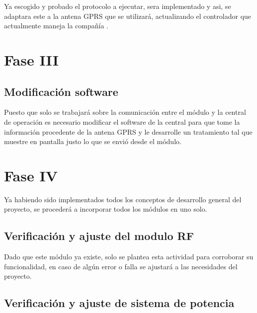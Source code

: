 Ya escogido y probado el protocolo a ejecutar, sera implementado y asi, se adaptara este a la antena GPRS que se utilizará, actualizando el controlador que actualmente maneja la compañía .

\section {Fase III}

\subsection{Modificación software }

Puesto que solo se trabajará sobre la comunicación entre el módulo y la central de operación es necesario modificar el software de la central para que tome la información procedente de la antena GPRS y le desarrolle un tratamiento tal que muestre en pantalla justo lo que se envió desde el módulo. 




\section {Fase IV}

Ya habiendo sido implementados todos los conceptos de desarrollo general del proyecto, se procederá a incorporar todos los módulos en uno solo.

\subsection{Verificación y ajuste del modulo RF}
Dado que este módulo ya existe, solo se plantea esta actividad para corroborar su funcionalidad, en caso de algún error o falla se ajustará a las necesidades del proyecto.

\subsection{Verificación y ajuste de sistema de potencia}

